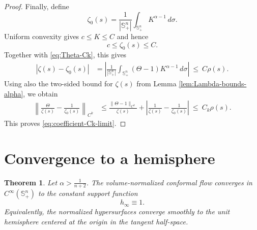 \documentclass[11pt, reqno]{amsart}
\newtheorem{theorem}{Theorem}[section]
\theoremstyle{remark}
\theoremstyle{definition}
\numberwithin{equation}{section}
\newcommand{\Sph}{\mathbb S}
\newcommand{\dd}{\,d}
\begin{document}
\begin{proof}
Finally, define
\begin{equation*}
    \zeta_0(s)
    =
    \frac{1}{|\mathbb S^n_+|}
    \int_{\mathbb S^n_+}K^{\alpha-1}\dd\sigma.
\end{equation*}
Uniform convexity gives $ c\leq K\leq C$ 
and hence
\begin{equation*}
    c\leq\zeta_0(s)\leq C.
\end{equation*}
Together with \eqref{eq:Theta-Ck}, this gives
\begin{align*}
    |\zeta(s)-\zeta_0(s)|
    &=
    \left|
    \frac{1}{|\mathbb S^n_+|}
    \int_{\mathbb S^n_+}
    (\Theta-1)K^{\alpha-1}\dd\sigma
    \right|~\leq ~C\rho(s).
\end{align*}
Using also the two-sided bound for $\zeta(s)$ from Lemma
\ref{lem:Lambda-bounds-alpha}, we obtain
\begin{align*}
    \left\|
        \frac{\Theta}{\zeta(s)}
        -\frac{1}{\zeta_0(s)}
    \right\|_{C^k}
    &\leq
    \frac{\|\Theta-1\|_{C^k}}{\zeta(s)}
    +
    \left|
        \frac{1}{\zeta(s)}
        -\frac{1}{\zeta_0(s)}
    \right|~\leq ~C_k\rho(s).
\end{align*}
This proves \eqref{eq:coefficient-Ck-limit}.
\end{proof}


\section{Convergence to a hemisphere}
\label{sec:convergence-alpha}

\begin{theorem}\label{thm:normalized-convergence-alpha}
Let $\alpha > \frac{1}{n+2}$.  The volume-normalized conformal flow converges in
$C^\infty(\Sph^n_+)$ to the constant support function
\begin{equation*}
        h_\infty\equiv1.
\end{equation*}
Equivalently, the normalized hypersurfaces converge smoothly to the unit
hemisphere centered at the origin in the tangent half-space.
\end{theorem}
\end{document}
